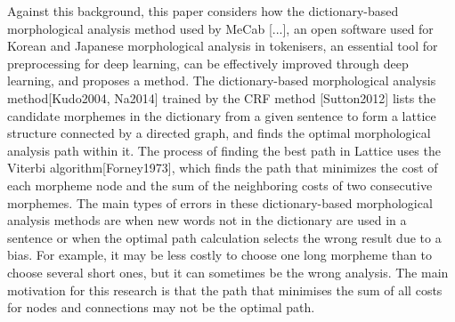 \documentclass[AMS,STIX2COL]{WileyNJD-v2}
\begin{document}

    Against this background, this paper considers how the dictionary-based morphological analysis method used by MeCab [...], an open software used for Korean and Japanese morphological analysis in tokenisers, an essential tool for preprocessing for deep learning, can be effectively improved through deep learning, and proposes a method.
    The dictionary-based morphological analysis method[Kudo2004, Na2014] trained by the CRF method [Sutton2012] lists the candidate morphemes in the dictionary from a given sentence to form a lattice structure connected by a directed graph, and finds the optimal morphological analysis path within it.
    The process of finding the best path in Lattice uses the Viterbi algorithm[Forney1973], which finds the path that minimizes the cost of each morpheme node and the sum of the neighboring costs of two consecutive morphemes.
    The main types of errors in these dictionary-based morphological analysis methods are when new words not in the dictionary are used in a sentence or when the optimal path calculation selects the wrong result due to a bias.
    For example, it may be less costly to choose one long morpheme than to choose several short ones, but it can sometimes be the wrong analysis.
    The main motivation for this research is that the path that minimises the sum of all costs for nodes and connections may not be the optimal path.
\end{document}
